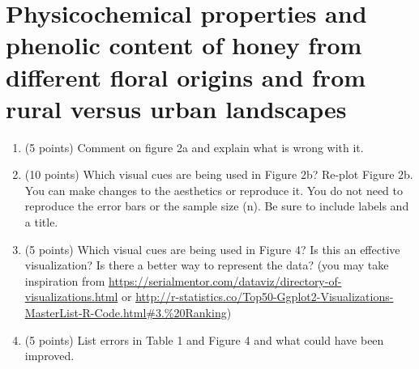 \documentclass[letterpaper,11pt,twoside,]{pinp}
\begin{document}
\hypertarget{physicochemical-properties-and-phenolic-content-of-honey-from-different-floral-origins-and-from-rural-versus-urban-landscapes}{%
\section{Physicochemical properties and phenolic content of honey from
different floral origins and from rural versus urban
landscapes}\label{physicochemical-properties-and-phenolic-content-of-honey-from-different-floral-origins-and-from-rural-versus-urban-landscapes}}

\begin{enumerate}
\def\labelenumi{\alph{enumi})}
\item
  (5 points) Comment on figure 2a and explain what is wrong with it.
\item
  (10 points) Which visual cues are being used in Figure 2b? Re-plot
  Figure 2b. You can make changes to the aesthetics or reproduce it. You
  do not need to reproduce the error bars or the sample size (n). Be
  sure to include labels and a title.
\item
  (5 points) Which visual cues are being used in Figure 4? Is this an
  effective visualization? Is there a better way to represent the data?
  (you may take inspiration from
  \url{https://serialmentor.com/dataviz/directory-of-visualizations.html}
  or
  \url{http://r-statistics.co/Top50-Ggplot2-Visualizations-MasterList-R-Code.html\#3.\%20Ranking})
\item
  (5 points) List errors in Table 1 and Figure 4 and what could have
  been improved.
\end{enumerate}





\end{document}
